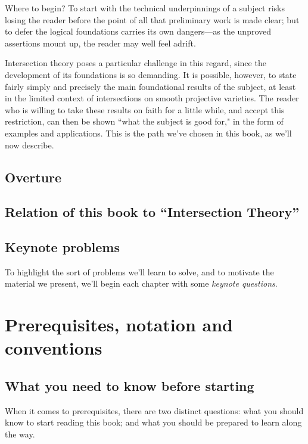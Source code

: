 Where to begin? To start with the technical underpinnings of a subject risks losing the reader before the point of all that preliminary work is made clear; but to defer the logical foundations carries its own dangers---as the unproved assertions mount up, the reader may well feel adrift.

Intersection theory poses a particular challenge in this regard, since the development of its foundations is so demanding. It is possible, however, to state fairly simply and precisely the main foundational results of the subject, at least in the limited context of intersections on smooth projective varieties. The reader who is willing to take these results on faith for a little while, and accept this restriction, can then be shown ``what the subject is good for," in the form of examples and applications. This is the path we've chosen in this book, as we'll now describe.

\subsection{Overture}



\subsection{Relation of this book to ``Intersection Theory''} 


\subsection{Keynote problems} To highlight the sort of problems we'll  learn to solve, and to motivate the material we present, we'll begin each chapter with some {\it keynote questions}. 


\section{Prerequisites, notation and conventions}

\subsection{What you need to know before starting}
When it comes to prerequisites, there are two distinct questions: what you should know to start reading this book; and what you should be prepared to learn along the way. 


